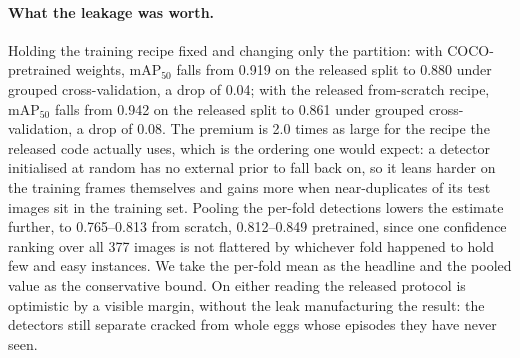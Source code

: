\paragraph{What the leakage was worth.} Holding the training recipe fixed and changing only
the partition: with COCO-pretrained weights, mAP$_{50}$ falls from 0.919 on the released split to
0.880 under grouped cross-validation, a drop of 0.04; with the released from-scratch recipe,
mAP$_{50}$ falls from 0.942 on the released split to 0.861 under grouped cross-validation, a drop
of 0.08. The premium is 2.0 times as large for the recipe the released code actually uses,
which is the ordering one would expect: a detector initialised at random has no external
prior to fall back on, so it leans harder on the training frames themselves and gains more
when near-duplicates of its test images sit in the training set. Pooling the per-fold
detections lowers the estimate further, to 0.765--0.813 from scratch, 0.812--0.849
pretrained, since one confidence ranking over all 377 images is not flattered by whichever
fold happened to hold few and easy instances. We take the per-fold mean as the headline and
the pooled value as the conservative bound. On either reading the released protocol is
optimistic by a visible margin, without the leak manufacturing the result: the detectors
still separate cracked from whole eggs whose episodes they have never seen.
